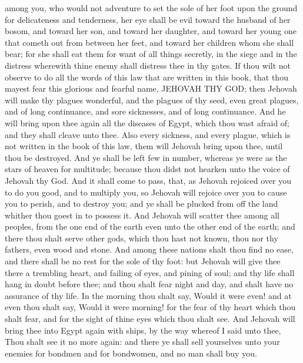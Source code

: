 among you, who would not adventure to set the sole of her foot upon the ground for delicateness and tenderness, her eye shall be evil toward the husband of her bosom, and toward her son, and toward her daughter, and toward her young one that cometh out from between her feet, and toward her children whom she shall bear; for she shall eat them for want of all things secretly, in the siege and in the distress wherewith thine enemy shall distress thee in thy gates.  If thou wilt not observe to do all the words of this law that are written in this book, that thou mayest fear this glorious and fearful name, JEHOVAH THY GOD; then Jehovah will make thy plagues wonderful, and the plagues of thy seed, even great plagues, and of long continuance, and sore sicknesses, and of long continuance. And he will bring upon thee again all the diseases of Egypt, which thou wast afraid of; and they shall cleave unto thee. Also every sickness, and every plague, which is not written in the book of this law, them will Jehovah bring upon thee, until thou be destroyed. And ye shall be left few in number, whereas ye were as the stars of heaven for multitude; because thou didst not hearken unto the voice of Jehovah thy God. And it shall come to pass, that, as Jehovah rejoiced over you to do you good, and to multiply you, so Jehovah will rejoice over you to cause you to perish, and to destroy you; and ye shall be plucked from off the land whither thou goest in to possess it. And Jehovah will scatter thee among all peoples, from the one end of the earth even unto the other end of the earth; and there thou shalt serve other gods, which thou hast not known, thou nor thy fathers, even wood and stone. And among these nations shalt thou find no ease, and there shall be no rest for the sole of thy foot: but Jehovah will give thee there a trembling heart, and failing of eyes, and pining of soul; and thy life shall hang in doubt before thee; and thou shalt fear night and day, and shalt have no assurance of thy life. In the morning thou shalt say, Would it were even! and at even thou shalt say, Would it were morning! for the fear of thy heart which thou shalt fear, and for the sight of thine eyes which thou shalt see. And Jehovah will bring thee into Egypt again with ships, by the way whereof I said unto thee, Thou shalt see it no more again: and there ye shall sell yourselves unto your enemies for bondmen and for bondwomen, and no man shall buy you. 

